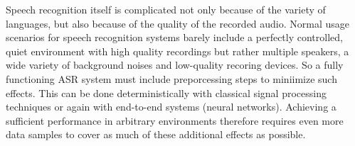 Speech recognition itself is complicated not only because of the variety of languages, but also because of the quality of the recorded audio. 
Normal usage scenarios for speech recognition systems barely include a perfectly controlled, quiet environment with high quality recordings but rather multiple speakers, a wide variety of background noises and low-quality recoring devices.
So a fully functioning ASR system must include preporcessing steps to miniimize such effects. 
This can be done deterministically with classical signal processing techniques or again with end-to-end systems (neural networks).
Achieving a sufficient performance in arbitrary environments therefore requires even more data samples to cover as much of these additional effects as possible.